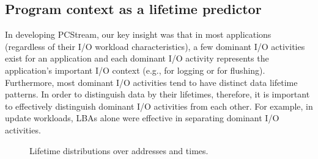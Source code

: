 \vspace{-10pt}
\subsection{Program context as a lifetime predictor}
In developing \textsf{\small PCStream}, our key insight was that in most applications 
(regardless of their I/O workload characteristics), 
a few dominant I/O activities exist for an application
and each dominant I/O activity   
represents the application's important I/O context (e.g., for logging or for flushing). 
Furthermore, most dominant I/O activities tend to have distinct data lifetime patterns.
In order to distinguish data by their lifetimes, therefore, 
it is important to effectively distinguish dominant I/O activities from each other.  
For example, in update workloads, 
LBAs alone were effective in separating dominant I/O activities.  

\begin{figure}[t]
	\centering
	\vspace{-7pt}
	\vspace{-7pt}
	\caption{Lifetime distributions over addresses and times.} %
		\label{fig:lba_lifetime}
	\vspace{-17pt}
\end{figure}

